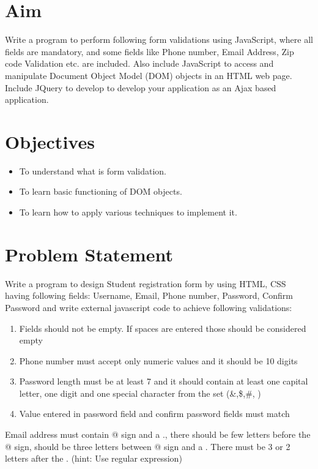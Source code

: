 \documentclass[11pt]{article}
\begin{document}
\tableofcontents
\thispagestyle{empty}
\clearpage

\setcounter{page}{1}

\section{Aim}
Write a program to perform following form validations using JavaScript, where all fields are mandatory, and some fields like Phone number, Email Address, Zip code Validation etc. are included. Also include JavaScript to access and manipulate Document Object Model (DOM) objects in an HTML web page. Include JQuery to develop to develop your application as an Ajax based application.


\section{Objectives}
\begin{itemize}
    \item To understand what is form validation.
    \item To learn basic functioning of DOM objects.
    \item To learn how to apply various techniques to implement it.
\end{itemize}

\section{Problem Statement}
Write a program to design Student registration form by using HTML, CSS having following
fields: Username, Email, Phone number, Password, Confirm Password and write external
javascript code to achieve following validations:
\begin{enumerate}
    \item Fields should not be empty. If spaces are entered those should be considered empty
    \item Phone number must accept only numeric values and it should be 10 digits
    \item Password length must be at least 7 and it should contain at least one capital letter, one digit and one special character from the set (\&,\$,\#, \@)
    \item Value entered in password field and confirm password fields must match
\end{enumerate}

Email address must contain @ sign and a ., there should be few letters before the @ sign, should be three letters between @ sign and a . There must be 3 or 2 letters after the . (hint: Use
regular expression)
\end{document}
